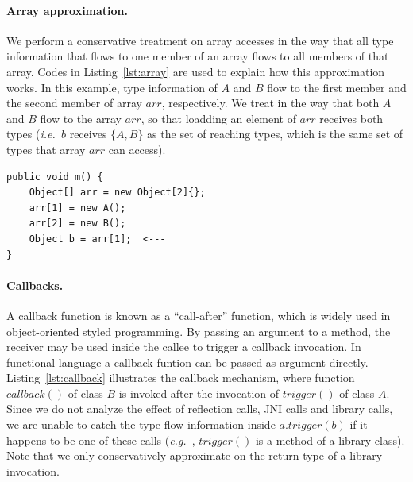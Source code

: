 \documentclass{fac}
\newcommand\eg{\textit{e.g.\ }}
\newcommand\ie{\textit{i.e.\ }}
\begin{document}
\paragraph{Array approximation.} We perform a conservative treatment on array accesses in the way that all type information that flows to one member of an array flows to all members of that array. Codes in Listing~\ref{lst:array} are used to explain how this approximation works. In this example, type information of $A$ and $B$ flow to the first member and the second member of array $arr$, respectively. We treat in the way that both $A$ and $B$ flow to the array $arr$, so that loadding an element of $arr$ receives both types (\ie $b$ receives $\{A, B\}$ as the set of reaching types, which is the same set of types that array $arr$ can access).

\begin{minipage}{\linewidth}
\vspace{10pt}
\begin{lstlisting}[caption={Example of array access},label={lst:array}]
public void m() {
	Object[] arr = new Object[2]{};
	arr[1] = new A();
	arr[2] = new B();
	Object b = arr[1];  <---
}
\end{lstlisting}
\end{minipage}

\paragraph{Callbacks.} A callback function is known as a ``call-after'' function, which is widely used in object-oriented styled programming. By passing an argument to a method, the receiver may be used inside the callee to trigger a callback invocation. In functional language a callback funtion can be passed as argument directly. Listing~\ref{lst:callback}
illustrates the callback mechanism, where function $callback()$ of class $B$ is invoked after the invocation of $trigger()$ of class $A$. Since we do not analyze the effect of reflection calls, JNI calls and library calls, we are unable to catch the type flow information inside $a.trigger(b)$ if it happens to be one of these calls (\eg, $trigger()$ is a method of a library class). Note that we only conservatively approximate on the return type of a library invocation. %
\end{document}
